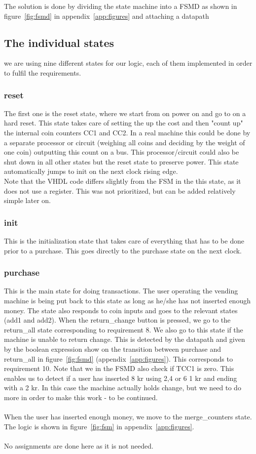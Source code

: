 The solution is done by dividing the state machine into a FSMD as shown in figure~\ref{fig:fsmd} in appendix~\ref{app:figures} and attaching a datapath

\subsection{The individual states}
we are using nine different states for our logic, each of them implemented in order to fulfil the requirements.
\subsubsection{reset}
The first one is the reset state, where we start from on power on and go to on a hard reset. This state takes care of setting the up the cost and
then "count up" the internal coin counters CC1 and CC2. In a real machine this could be done by a separate processor or circuit (weighing all coins
and deciding by the weight of one coin) outputting this count on a bus. This processor/circuit could also be shut down in all other states but the 
reset state to preserve power. This state automatically jumps to init on the next clock rising edge.\\
Note that the VHDL code differs slightly from the FSM in the this state, as it does not use a register. This was not prioritized, but can be added relatively simple later on.

\subsubsection{init}
This is the initialization state that takes care of everything that has to be done prior to a purchase. This goes directly to the purchase state on the next clock.

\subsubsection{purchase}
This is the main state for doing transactions. The user operating the vending machine is being put back to this state as long as he/she has not inserted enough
money. The state also responds to coin inputs and goes to the relevant states (add1 and add2). When the return\_change button is pressed, we go
to the return\_all state corresponding to requirement 8. We also go to this state if the machine is unable to return change. This is detected by
the datapath and given by the boolean expression show on the transition between purchase and return\_all in figure~\ref{fig:fsmd} (appendix~\ref{app:figures}). This corresponds to requirement 10. Note that we in the FSMD also check if TCC1 is zero. This enables us to detect if 
a user has inserted 8 kr using 2,4 or 6 1 kr and ending with a 2 kr. In this case the machine actually holds change, but we need to do more in order
to make this work - to be continued.\\
\\
When the user has inserted enough money, we move to the merge\_counters state. The logic is shown in figure~\ref{fig:fsm} in appendix~\ref{app:figures}.\\
\\
No assignments are done here as it is not needed.

